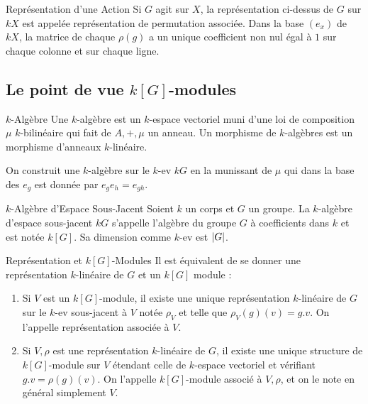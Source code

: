\documentclass{cours}
\begin{document}
\begin{définition}{Représentation d'une Action}{}
    Si $G$ agit sur $X$, la représentation ci-dessus de $G$ sur $kX$ est appelée représentation de permutation associée. Dans la base $(e_{x})$ de $kX$, la matrice de chaque $\rho(g)$ a un unique coefficient non nul égal à $1$ sur chaque colonne et sur chaque ligne.
\end{définition}

\subsection{Le point de vue $k[G]$-modules}
\begin{définition}{$k$-Algèbre}{}
    Une $k$-algèbre est un $k$-espace vectoriel muni d'une loi de composition $\mu$ $k$-bilinéaire qui fait de $A, +, \mu$ un anneau. Un morphisme de $k$-algèbres est un morphisme d'anneaux $k$-linéaire.
\end{définition}

On construit une $k$-algèbre sur le $k$-ev $kG$ en la munissant de $\mu$ qui dans la base des $e_{g}$ est donnée par $e_{g}e_{h} = e_{gh}$.

\begin{définition}{$k$-Algèbre d'Espace Sous-Jacent}{}
    Soient $k$ un corps et $G$ un groupe. La $k$-algèbre d'espace sous-jacent $kG$ s'appelle l'algèbre du groupe $G$ à coefficients dans $k$ et est notée $k[G]$. Sa dimension comme $k$-ev est $\left|G\right|$.
\end{définition}

\begin{propositionfr}{Représentation et $k[G]$-Modules}{}
    Il est équivalent de se donner une représentation $k$-linéaire de $G$ et un $k[G]$ module :
    \begin{enumerate}
        \item Si $V$ est un $k[G]$-module, il existe une unique représentation $k$-linéaire de $G$ sur le $k$-ev sous-jacent à $V$ notée $\rho_{V}$ et telle que $\rho_{V}(g)(v) = g.v$. On l'appelle représentation associée à $V$.
        \item Si $V, \rho$ est une représentation $k$-linéaire de $G$, il existe une unique structure de $k[G]$-module sur $V$ étendant celle de $k$-espace vectoriel et vérifiant $g.v = \rho(g)(v)$. On l'appelle $k[G]$-module associé à $V, \rho$, et on le note en général simplement $V$.
    \end{enumerate}
\end{propositionfr}
\end{document}
